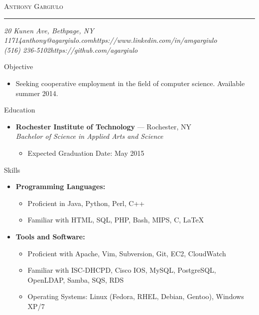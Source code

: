 \documentclass[10pt,oneside]{article}
\makeatletter
\newcommand{\name}{Anthony Gargiulo}
\newcommand{\addr}{20 Kunen Ave, Bethpage, NY 11714}
\newcommand{\mobilePhone}{(516) 236-5102}
\newcommand{\email}{anthony@agargiulo.com}
\newcommand{\github}{https://github.com/agargiulo}
\newcommand{\linkedin}{https://www.linkedin.com/in/amgargiulo}
\newcommand{\bigname}[1]{
	\begin{center}\fontfamily{ppl}\selectfont\Huge\scshape#1\end{center}
}
\newenvironment{ressection}[1]{
	\vspace{3pt}
	{\fontfamily{ppl}\selectfont\Large#1}
	\begin{itemize}
	\vspace{2pt}
}{
	\end{itemize}
}
\newcommand{\resitem}[1]{
	\vspace{-2pt}
	\item \begin{flushleft} #1 \end{flushleft}
}
\newcommand{\ressubitem}[1]{
	\vspace{-1pt}
	\item \begin{flushleft} #1 \end{flushleft}
}
\newcommand{\resbigitem}[3]{
	\vspace{-3pt}
	\item
	\textbf{#1} --- #2 \\
	\textit{#3}
}
\newenvironment{ressubsec}[3]{
	\resbigitem{#1}{#2}{#3}
	\vspace{-1pt}
	\begin{itemize}
}{
	\end{itemize}
}
\newenvironment{reslist}[1]{
	\resitem{\textbf{#1}}
	\vspace{-3pt}
	\begin{itemize}
}{
	\end{itemize}
}
\makeatother
\begin{document}
 \selectfont

\bigname{\name}

\vspace{-4pt} \rule{\textwidth}{1pt}

\vspace{-1pt} {\normalsize\itshape \addr \hfill \email \hfill \linkedin \\ \mobilePhone \hfill \github}

\vspace{15 pt}



\begin{ressection}{Objective}

	\ressubitem{Seeking cooperative employment in the field of computer science. Available summer 2014.}

\end{ressection}
\begin{ressection}{Education}

	\begin{ressubsec}{Rochester Institute of Technology}{Rochester, NY}{Bachelor of Science in Applied Arts and Science}
		\ressubitem{Expected Graduation Date: May 2015}
	\end{ressubsec}

\end{ressection}

\begin{ressection}{Skills}


	\begin{reslist}{Programming Languages:}
		\ressubitem{Proficient in Java, Python, Perl, C++}
		\ressubitem{Familiar with HTML, SQL, PHP, Bash, MIPS, C, \LaTeX}
	\end{reslist}

	\begin{reslist}{Tools and Software:}
		\ressubitem{Proficient with Apache, Vim, Subversion, Git, EC2, CloudWatch}
		\ressubitem{Familiar with ISC-DHCPD, Cisco IOS, MySQL, PostgreSQL, OpenLDAP, Samba, SQS, RDS}
		\ressubitem{Operating Systems: Linux (Fedora, RHEL, Debian, Gentoo), Windows XP/7}
	\end{reslist}

\end{ressection}
\end{document}
